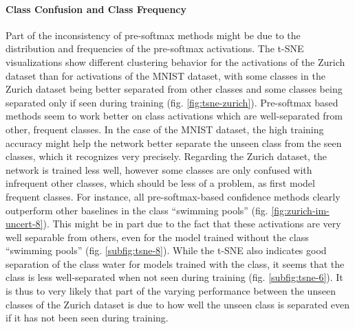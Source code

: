 \documentclass[10pt]{article}
\begin{document}
\paragraph{Class Confusion and Class Frequency} Part of the inconsistency of pre-softmax methods might be due to the distribution and frequencies of the pre-softmax activations. The \gls{t-SNE} visualizations show different clustering behavior for the activations of the Zurich dataset than for activations of the \gls{MNIST} dataset, with some classes in the Zurich dataset being better separated from other classes and some classes being separated only if seen during training (fig. \ref{fig:tsne-zurich}). Pre-softmax based methods seem to work better on class activations which are well-separated from other, frequent classes. In the case of the \gls{MNIST} dataset, the high training accuracy might help the network better separate the unseen class from the seen classes, which it recognizes very precisely. Regarding the Zurich dataset, the network is trained less well, however some classes are only confused with infrequent other classes, which should be less of a problem, as  first model frequent classes. For instance, all pre-softmax-based confidence methods clearly outperform other baselines in the class ``swimming pools'' (fig. \ref{fig:zurich-im-uncert-8}). This might be in part due to the fact that these activations are very well separable from others, even for the model trained without the class ``swimming pools'' (fig. \ref{subfig:tsne-8}). While the \gls{t-SNE} also indicates good separation of the class water for models trained with the class, it seems that the class is less well-separated when not seen during training (fig. \ref{subfig:tsne-6}). It is thus to very likely that part of the varying performance between the unseen classes of the Zurich dataset is due to how well the unseen class is separated even if it has not been seen during training.

\end{document}
